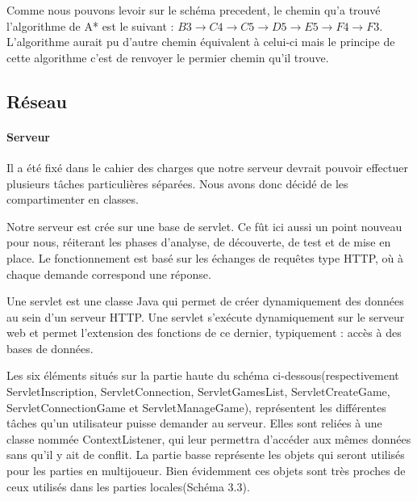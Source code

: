 			Comme nous pouvons levoir sur le schéma precedent, le chemin qu'a trouvé l'algorithme de A* est le suivant : $ B3 \rightarrow C4 \rightarrow C5 \rightarrow D5 \rightarrow E5 \rightarrow F4 \rightarrow F3 $. L'algorithme aurait pu d'autre chemin équivalent à celui-ci mais le principe de cette algorithme c'est de renvoyer le permier chemin qu'il trouve.


\subsection{Réseau}
		
	\paragraph{Serveur\\}
			
		Il a été fixé dans le cahier des charges que notre serveur devrait pouvoir
		effectuer plusieurs tâches particulières séparées. Nous avons donc décidé de
		les compartimenter en classes.
		
		Notre serveur est crée sur une base de servlet. Ce fût ici
		aussi un point nouveau pour nous, réiterant les phases d'analyse, de
		découverte, de test et de mise en place. Le fonctionnement est basé sur les
		échanges de requêtes type HTTP, où à chaque demande correspond une réponse. 
		
		Une servlet est une classe Java qui permet de créer dynamiquement des données
		au sein d'un serveur HTTP. Une servlet s'exécute dynamiquement sur le serveur
		web et permet l'extension des fonctions de ce dernier, typiquement : accès à
		des bases de données.
			
		Les six éléments situés sur la partie haute du schéma
		ci-dessous(respectivement ServletInscription, ServletConnection,
		ServletGamesList, ServletCreateGame, ServletConnectionGame et
		ServletManageGame), représentent les différentes tâches qu'un utilisateur
		puisse demander au serveur. Elles sont reliées à une classe nommée
		ContextListener, qui leur permettra d'accéder aux mêmes données sans qu'il y
		ait de conflit. La partie basse représente les objets qui seront utilisés 
		pour les parties en multijoueur. 
		Bien évidemment ces objets sont très proches de ceux utilisés dans les parties
		locales(Schéma 3.3).
		
